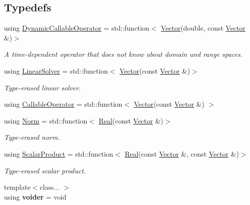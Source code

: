 \subsection*{Typedefs}
\begin{DoxyCompactItemize}
\item 
using \hyperlink{namespaceSpacy_a052e6b83b913fc316b0c2a2cd9535431}{Dynamic\-Callable\-Operator} = std\-::function$<$ \hyperlink{classSpacy_1_1Vector}{Vector}(double, const \hyperlink{classSpacy_1_1Vector}{Vector} \&)$>$
\begin{DoxyCompactList}\small\item\em A time-\/dependent operator that does not know about domain and range spaces. \end{DoxyCompactList}\item 
\hypertarget{namespaceSpacy_adcd0d78166a9c972b8a2e5a689fc2d03}{using \hyperlink{namespaceSpacy_adcd0d78166a9c972b8a2e5a689fc2d03}{Linear\-Solver} = std\-::function$<$ \hyperlink{classSpacy_1_1Vector}{Vector}(const \hyperlink{classSpacy_1_1Vector}{Vector} \&)$>$}\label{namespaceSpacy_adcd0d78166a9c972b8a2e5a689fc2d03}

\begin{DoxyCompactList}\small\item\em Type-\/erased linear solver. \end{DoxyCompactList}\item 
using \hyperlink{namespaceSpacy_a022a87afa759e18781dd2aea9a80cd73}{Callable\-Operator} = std\-::function$<$ \hyperlink{classSpacy_1_1Vector}{Vector}(const \hyperlink{classSpacy_1_1Vector}{Vector} \&) $>$
\item 
using \hyperlink{namespaceSpacy_a0dbe77a4e1282ef88017e94d50d17791}{Norm} = std\-::function$<$ \hyperlink{classSpacy_1_1Real}{Real}(const \hyperlink{classSpacy_1_1Vector}{Vector} \&)$>$
\begin{DoxyCompactList}\small\item\em Type-\/erased norm. \end{DoxyCompactList}\item 
using \hyperlink{namespaceSpacy_aa995526aa0e3fa58aca8dd6772311cad}{Scalar\-Product} = std\-::function$<$ \hyperlink{classSpacy_1_1Real}{Real}(const \hyperlink{classSpacy_1_1Vector}{Vector} \&, const \hyperlink{classSpacy_1_1Vector}{Vector} \&)$>$
\begin{DoxyCompactList}\small\item\em Type-\/erased scalar product. \end{DoxyCompactList}\item 
\hypertarget{namespaceSpacy_a104eb3859bf3e6465a7789c84e9ab1f7}{{\footnotesize template$<$class... $>$ }\\using {\bfseries voider} = void}\label{namespaceSpacy_a104eb3859bf3e6465a7789c84e9ab1f7}

\end{DoxyCompactItemize}

